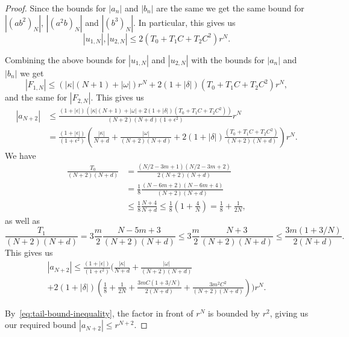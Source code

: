 \documentclass[10pt,a4paper]{amsart}
\begin{document}
\begin{proof}
  Since the bounds for \(|a_n|\) and \(|b_n|\) are the same we get the
  same bound for \(|(ab^2)_N|\), \(|(a^2b)_N|\) and \(|(b^3)_N|\). In
  particular, this gives us
  \begin{equation*}
    |u_{1,N}|, |u_{2,N}| \leq 2(T_{0} + T_{1}C + T_{2}C^{2})r^{N}.
  \end{equation*}

  Combining the above bounds for \(|u_{1,N}|\) and \(|u_{2,N}|\) with
  the bounds for \(|a_n|\) and \(|b_n|\) we get
  \begin{equation*}
    |F_{1,N}| \leq (|\kappa|(N + 1) + |\omega|)r^{N} + 2(1 + |\delta|)(T_{0} + T_{1}C + T_{2}C^{2})r^{N},
  \end{equation*}
  and the same for \(|F_{2,N}|\). This gives us
  \begin{equation*}
    \begin{split}
      |a_{N + 2}|
      &\leq \frac{(1 + |\epsilon|)(|\kappa|(N + 1) + |\omega| + 2(1 + |\delta|)(T_{0} + T_{1}C + T_{2}C^{2}))}{(N + 2)(N + d)(1 + \epsilon^{2})}r^{N}\\
      &= \frac{(1 + |\epsilon|)}{(1 + \epsilon^{2})}\left(
        \frac{|\kappa|}{N + d}
        + \frac{|\omega|}{(N + 2)(N + d)}
        + 2(1 + |\delta|)\frac{(T_{0} + T_{1}C + T_{2}C^{2})}{(N + 2)(N + d)}
        \right)r^{N}.
    \end{split}
  \end{equation*}
  We have
  \begin{equation*}
    \begin{split}
      \frac{T_{0}}{(N + 2)(N + d)}
      &= \frac{(N/2 - 3m + 1)(N/2 - 3m + 2)}{2(N + 2)(N + d)}\\
      &= \frac{1}{8}\frac{(N - 6m + 2)(N - 6m + 4)}{(N + 2)(N + d)}\\
      &\leq \frac{1}{8}\frac{N + 4}{N + d}
        \leq \frac{1}{8}\left(1 + \frac{4}{N}\right)
        = \frac{1}{8} + \frac{1}{2N},
    \end{split}
  \end{equation*}
  as well as
  \begin{equation*}
    \frac{T_{1}}{(N + 2)(N + d)}
    = 3\frac{m}{2}\frac{N - 5m + 3}{(N + 2)(N + d)}
    \leq 3\frac{m}{2}\frac{N + 3}{(N + 2)(N + d)}
    \leq \frac{3m(1 + 3/N)}{2(N + d)}.
  \end{equation*}
  This gives us
  \begin{multline*}
    |a_{N + 2}|
    \leq \frac{(1 + |\epsilon|)}{(1 + \epsilon^{2})}\Bigg(
    \frac{|\kappa|}{N + d}
      + \frac{|\omega|}{(N + 2)(N + d)}\\
      + 2(1 + |\delta|)\left(
        \frac{1}{8} + \frac{1}{2N}
        + \frac{3mC(1 + 3/N)}{2(N + d)}
        + \frac{3m^{2}C^{2}}{(N + 2)(N + d)}
      \right)
    \Bigg)r^{N}.
  \end{multline*}

  By~\eqref{eq:tail-bound-inequality}, the factor in front of
  \(r^{N}\) is bounded by \(r^{2}\), giving us our required bound
  \(|a_{N + 2}| \leq r^{N + 2}\).
\end{proof}
\end{document}
